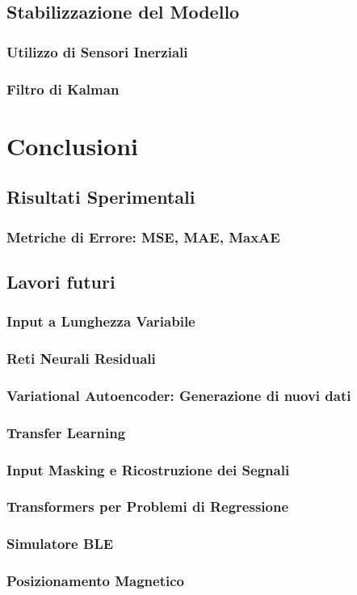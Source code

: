 \documentclass[12pt]{report}
\begin{document}
\section{Stabilizzazione del Modello}
\subsection{Utilizzo di Sensori Inerziali}
\subsection{Filtro di Kalman}

\chapter{Conclusioni}
\section{Risultati Sperimentali}
\subsection{Metriche di Errore: MSE, MAE, MaxAE}

\section{Lavori futuri}
\subsection{Input a Lunghezza Variabile}
\subsection{Reti Neurali Residuali}
\subsection{Variational Autoencoder: Generazione di nuovi dati}
\subsection{Transfer Learning}
\subsection{Input Masking e Ricostruzione dei Segnali}
\subsection{Transformers per Problemi di Regressione}
\subsection{Simulatore BLE}
\subsection{Posizionamento Magnetico}

\appendix

\printbibliography
\end{document}
